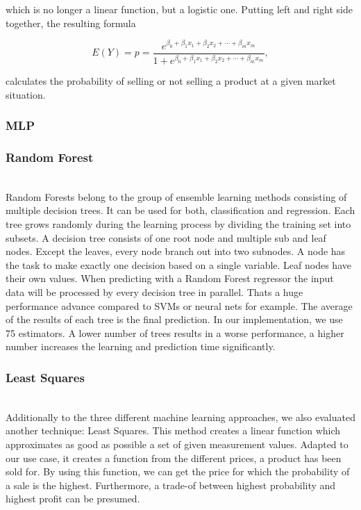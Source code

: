    which is no longer a linear function, but a logistic one. Putting left and right side together, the resulting formula

    \begin{equation}
    \label{eq.logreg.logsolved}
    E(Y) = p = \frac{e^{\beta _{0}+\beta _{1}x_{1}+\beta _{2}x_{2}+\cdots +\beta _{m}x_{m}}}{1+e^{\beta _{0}+\beta _{1}x_{1}+\beta _{2}x_{2}+\cdots +\beta _{m}x_{m}}},
    \end{equation}

    calculates the probability of selling or not selling a product at a given market situation.

\subsubsection{MLP}
\subsubsection{Random Forest}
    ~\\
    Random Forests belong to the group of ensemble learning methods consisting of multiple decision trees. It can be used for both, classification and regression. Each tree grows randomly during the learning process by dividing the training set into subsets. A decision tree consists of one root node and multiple sub and leaf nodes. Except the leaves, every node branch out into two subnodes. A node has the task to make exactly one decision based on a single variable. Leaf nodes have their own values. When predicting with a Random Forest regressor the input data will be processed by every decision tree in parallel. Thats a huge performance advance compared to SVMs or neural nets for example. The average of the results of each tree is the final prediction.
    In our implementation, we use 75 estimators. A lower number of trees results in a worse performance, a higher number increases the learning and prediction time significantly.
\subsubsection{Least Squares}
	~\\
	Additionally to the three different machine learning approaches, we also evaluated another technique: Least Squares. This method creates a linear function which approximates as good as possible a set of given measurement values. Adapted to our use case, it creates a function from the different prices, a product has been sold for. By using this function, we can get the price for which the probability of a sale is the highest. Furthermore, a trade-of between highest probability and highest profit can be presumed.

